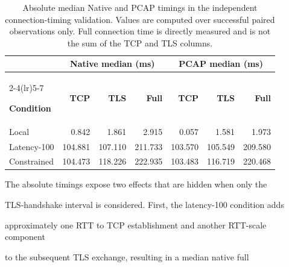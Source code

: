 \documentclass[journal]{IEEEtran}
\begin{document}
\begin{table}[t]

\caption{Absolute median Native and PCAP timings in the independent connection-timing validation. Values are computed over successful paired observations only. Full connection time is directly measured and is not the sum of the TCP and TLS columns.}

\label{tab:native-pcap-absolute}

\centering

\begin{tabular}{lrrrrrr}

\toprule

& \multicolumn{3}{c}{\textbf{Native median (ms)}} &

 \multicolumn{3}{c}{\textbf{PCAP median (ms)}} \\

\cmidrule(lr){2-4}\cmidrule(lr){5-7}

\textbf{Condition} &

\textbf{TCP} &

\textbf{TLS} &

\textbf{Full} &

\textbf{TCP} &

\textbf{TLS} &

\textbf{Full} \\

\midrule

Local       & 0.842   & 1.861   & 2.915   & 0.057   & 1.581   & 1.973 \\

Latency-100 & 104.881 & 107.110 & 211.733 & 103.570 & 105.549 & 209.580 \\

Constrained & 104.473 & 118.226 & 222.935 & 103.483 & 116.719 & 220.468 \\

\bottomrule

\end{tabular}

\end{table}



The absolute timings expose two effects that are hidden when only the

TLS-handshake interval is considered. First, the latency-100 condition adds

approximately one RTT to TCP establishment and another RTT-scale component

to the subsequent TLS exchange, resulting in a median native full
\end{document}
